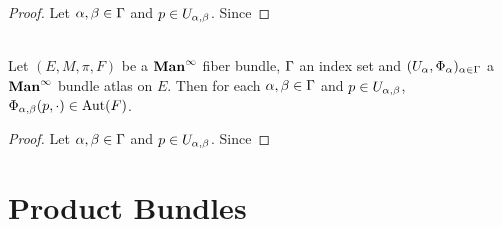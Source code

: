 \documentclass{book}
\begin{document}
	\begin{proof}
		Let $\alpha, \beta \in \Gamma$ and $p \in U_{\alpha, \beta}$. Since 
	\end{proof}

	\begin{ex}  \\
		Let $(E, M, \pi, F)$ be a $\operatorname*{\text{\textbf{Man}}^{\infty}}$ fiber bundle, $\Gamma$ an index set and $(U_{\alpha}, \Phi_{\alpha})_{\alpha \in \Gamma}$ a $\operatorname*{\text{\textbf{Man}}^{\infty}}$ bundle atlas on $E$. Then for each $\alpha, \beta \in \Gamma$ and $p \in U_{\alpha, \beta}$, $\Phi_{\alpha,\beta}(p, \cdot) \in \operatorname{Aut}(F)$.
	\end{ex}
	
	\begin{proof}
		Let $\alpha, \beta \in \Gamma$ and $p \in U_{\alpha, \beta}$. Since 
	\end{proof}
	
	\begin{defn}
		
	\end{defn}


	
	
	
	
	
	
	
	
	
	
	
	
	
	
	
	
	
	
	
	
	
	
	
	
	
	
	
	
	
	
	
		\newpage
	\section{Product Bundles}
	
	\begin{defn}
		
	\end{defn}
	
	
	
	
	
	
	
	
	
	
	
	
	
	
	
	
	
	
	
	
	
\end{document}
